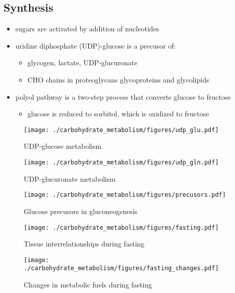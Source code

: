 \documentclass{scrartcl}
\begin{document}
\subsection{Synthesis}
\label{sec:org5838837}
\begin{itemize}
\item sugars are activated by addition of nucleotides
\item uridine diphosphate (UDP)-glucose is a precusor of:
\begin{itemize}
\item glycogen, lactate, UDP-glucuronate
\item CHO chains in proteoglycans glycoproteins and glycolipids
\end{itemize}
\item polyol pathway is a two-step process that converts glucose to
fructose
\begin{itemize}
\item glucose is reduced to sorbitol, which is oxidized to fructose
\end{itemize}
\end{itemize}

\begin{figure}[htbp]
\centering
\texttt{[image: ./carbohydrate\_metabolism/figures/udp\_glu.pdf]}
\caption{\label{fig:org078c2c9}
UDP-glucose metabolism}
\end{figure}

\begin{figure}[htbp]
\centering
\texttt{[image: ./carbohydrate\_metabolism/figures/udp\_gln.pdf]}
\caption{\label{fig:org5c88d8c}
UDP-glucuronate metabolism}
\end{figure}

\begin{figure}[htbp]
\centering
\texttt{[image: ./carbohydrate\_metabolism/figures/precusors.pdf]}
\caption{\label{fig:orgd1c4b2e}
Glucose precusors in gluconeogenesis}
\end{figure}


\begin{figure}[htbp]
\centering
\texttt{[image: ./carbohydrate\_metabolism/figures/fasting.pdf]}
\caption{\label{fig:org44cc2f1}
Tissue interrelationships during fasting}
\end{figure}


\begin{figure}[htbp]
\centering
\texttt{[image: ./carbohydrate\_metabolism/figures/fasting\_changes.pdf]}
\caption{\label{fig:org4472d09}
Changes in metabolic fuels during fasting}
\end{figure}
\end{document}
